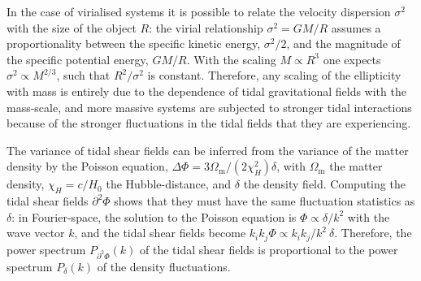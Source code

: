 \documentclass[a4paper,fleqn,usenatbib]{mnras}
\begin{document}
In the case of virialised systems it is possible to relate the velocity dispersion $\sigma^2$ with the size of the object $R$: the virial relationship $\sigma^2 = GM/R$ assumes a proportionality between the specific kinetic energy, $\sigma^2/2$, and the magnitude of the specific potential energy, $GM/R$. With the scaling $M\propto R^3$ one expects $\sigma^2\propto M^{2/3}$, such that $R^2/\sigma^2$ is constant. Therefore, any scaling of the ellipticity with mass is entirely due to the dependence of tidal gravitational fields with the mass-scale, and more massive systems are subjected to stronger tidal interactions because of the stronger fluctuations in the tidal fields that they are experiencing.

The variance of tidal shear fields can be inferred from the variance of the matter density by the Poisson equation, $\Delta\Phi = 3\Omega_\mathrm{m}/(2\chi_H^2)\delta$, with $\Omega_\mathrm{m}$ the matter density, $\chi_H=c/H_0$ the Hubble-distance, and $\delta$ the density field. Computing the tidal shear fields $\partial^2\Phi$ shows that they must have the same fluctuation statistics as $\delta$: in Fourier-space, the solution to the Poisson equation is $\Phi \propto \delta/k^2$ with the wave vector $k$, and the tidal shear fields become $k_ik_j\Phi \propto k_ik_j/k^2\:\delta$. Therefore, the power spectrum $P_{\partial^2\Phi}(k)$ of the tidal shear fields is proportional to the power spectrum $P_\delta(k)$ of the density fluctuations.
\end{document}

